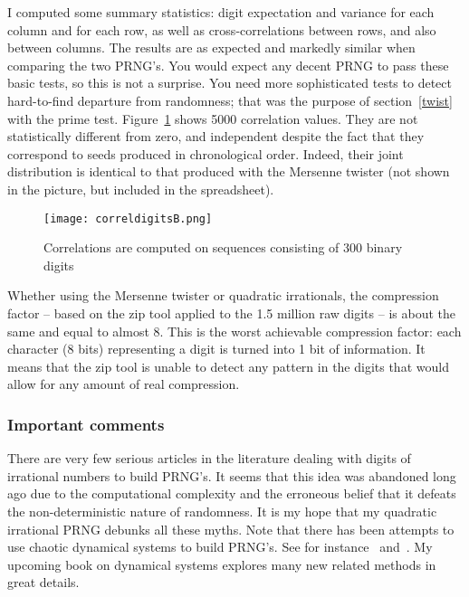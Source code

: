 \documentclass[oneside,10pt]{book}
\begin{document}
I computed some summary statistics:  digit expectation and variance for each column and for each row, as well as cross-correlations between rows, and also between columns. The results are as expected and markedly similar when comparing the two PRNG's. You would expect any decent PRNG to pass these basic tests, so this is not a surprise. You need more sophisticated tests to detect hard-to-find departure from randomness; that was the purpose of section~\ref{twist} with the prime test.  Figure~\ref{fig:rn1digyt} shows 5000 correlation values. They are not statistically different from zero, and
 independent despite the fact that they correspond to seeds produced in chronological order. Indeed, their joint distribution is identical to that produced with the Mersenne twister (not shown in the picture, but included in the spreadsheet).

\begin{figure}%
\centering
\texttt{[image: correldigitsB.png]}
\caption{Correlations are computed on sequences consisting of 300 binary digits}
\label{fig:rn1digyt}
\end{figure}

Whether using the Mersenne twister or quadratic irrationals, the compression factor -- based on the zip tool applied to the 1.5 million raw digits -- is
 about the same and equal to almost 8. This is the worst achievable compression factor: each character (8 bits) representing a digit is
 turned into 1 bit of information. It means that the zip tool is unable to detect any pattern in the digits that would allow
 for any amount of real compression.

\subsubsection{Important comments}

There are very few serious articles in the literature dealing with digits of irrational numbers  to build PRNG's. It seems that this idea was abandoned long ago due to the computational complexity and the erroneous belief that it defeats
 the non-deterministic nature of randomness. It is my hope that my quadratic irrational PRNG debunks all these myths. Note that there has been attempts to use chaotic dynamical systems to build PRNG's. See for instance~\cite{loginew} and~\cite{expmdb2002}. My upcoming book on dynamical systems explores  many new related methods in great details.
\end{document}
